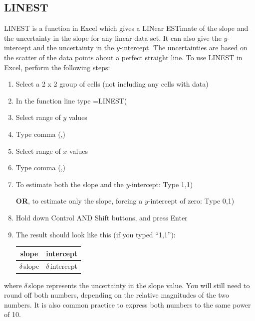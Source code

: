 
\subsection*{LINEST}

LINEST is a function in Excel which gives a LINear ESTimate of the slope and the uncertainty in the slope for any linear data set. It can also give the $y$-intercept and the uncertainty in the $y$-intercept.  The uncertainties are based on the scatter of the data points about a perfect straight line. To use LINEST in Excel, perform the following steps:

\begin{enumerate}

\item Select a 2 x 2 group of cells (not including any cells with data)
\item In the function line type =LINEST(
\item Select range of $y$ values
\item Type comma (,)
\item Select range of $x$ values
\item Type comma (,)
\item To estimate both the slope and the $y$-intercept: Type 1,1)

\textbf{OR}, to estimate only the slope, forcing a $y$-intercept of zero: Type 0,1)
\item Hold down Control AND Shift buttons, and press Enter
\item The result should look like this (if you typed ``1,1''):

\begin{center} \begin{tabular}{|c|c|} \hline slope & intercept \\ \hline \( \delta \, \)slope & \( \delta \, \)intercept \\ \hline \end{tabular} \end{center}

\end{enumerate}

where \( \delta\, \)slope represents the uncertainty in the slope value. You will still need to round off both numbers, depending on the relative magnitudes of the two numbers. It is also common practice to express both numbers to the same power of 10.

